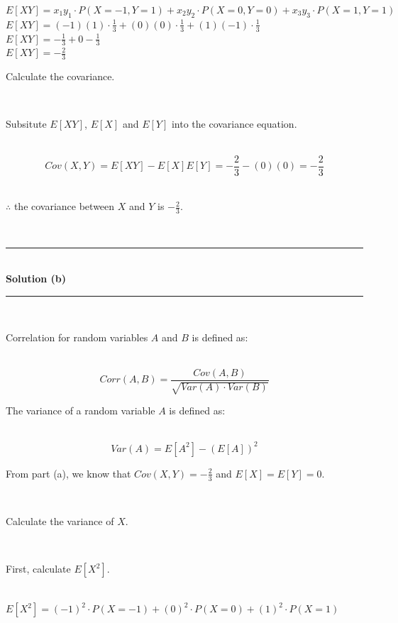 \documentclass{article}
\begin{document}
$E[XY] = x_1 y_1\cdot P(X=-1,Y=1) + x_2 y_2\cdot P(X=0,Y=0)+ x_3 y_3\cdot P(X=1,Y=1)$\\

$E[XY] = (-1)(1) \cdot \frac{1}{3} + (0)(0) \cdot \frac{1}{3}+ (1)(-1)\cdot \frac{1}{3}$\\

$E[XY] = -\frac{1}{3} + 0 - \frac{1}{3}$\\

$E[XY] = -\frac{2}{3}$\\

\parbox{\textwidth}{Calculate the covariance.}\\

\parbox{\textwidth}{Subsitute $E[XY]$, $E[X]$ and $E[Y]$ into the covariance equation.}\\

$$Cov(X, Y) = E[XY] - E[X]E[Y] = -\frac{2}{3} - (0)(0) = -\frac{2}{3}$$\\

\parbox{\textwidth}{$\therefore$ the covariance between $X$ and $Y$ is $-\frac{2}{3}$.}\\

\noindent\rule{\textwidth}{0.4pt}\\

\textbf{Solution (b)}

\noindent\rule{\textwidth}{0.4pt}\\

\parbox{\textwidth}{Correlation for random variables $A$ and $B$ is defined as:}\\

$$Corr(A, B) = \frac{Cov(A, B)}{\sqrt{Var(A) \cdot Var(B)}}$$

\parbox{\textwidth}{The variance of a random variable $A$ is defined as:}\\

$$Var(A) = E[A^2] - (E[A])^2$$

\parbox{\textwidth}{From part (a), we know that $Cov(X,Y) = -\frac{2}{3}$ and $E[X] = E[Y] = 0$.}\\

\parbox{\textwidth}{Calculate the variance of $X$.}\\

\parbox{\textwidth}{First, calculate $E[X^2]$.}\\

$E[X^2] = (-1)^2 \cdot P(X = -1) + (0)^2 \cdot P(X = 0) + (1)^2 \cdot P(X = 1)$\\
\end{document}
